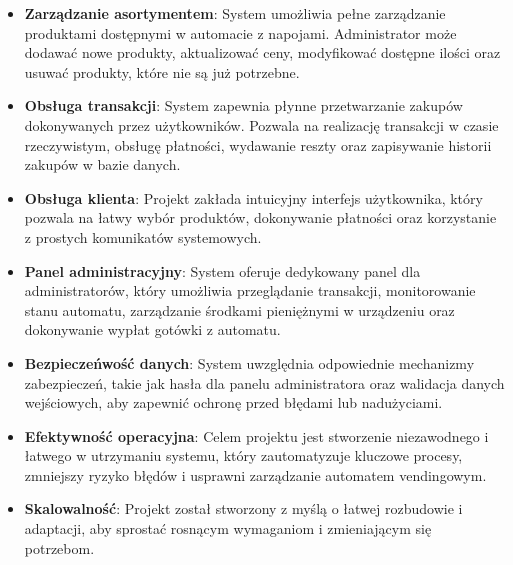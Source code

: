 \begin{itemize}
\item \textbf{Zarządzanie asortymentem}: System umożliwia pełne zarządzanie produktami dostępnymi w automacie z napojami. Administrator może dodawać nowe produkty, aktualizować ceny, modyfikować dostępne ilości oraz usuwać produkty, które nie są już potrzebne.

\item \textbf{Obsługa transakcji}: System zapewnia płynne przetwarzanie zakupów dokonywanych przez użytkowników. Pozwala na realizację transakcji w czasie rzeczywistym, obsługę płatności, wydawanie reszty oraz zapisywanie historii zakupów w bazie danych.

\item \textbf{Obsługa klienta}: Projekt zakłada intuicyjny interfejs użytkownika, który pozwala na łatwy wybór produktów, dokonywanie płatności oraz korzystanie z prostych komunikatów systemowych. 

\item \textbf{Panel administracyjny}: System oferuje dedykowany panel dla administratorów, który umożliwia przeglądanie transakcji, monitorowanie stanu automatu, zarządzanie środkami pieniężnymi w urządzeniu oraz dokonywanie wypłat gotówki z automatu.

\item \textbf{Bezpieczeńwość danych}: System uwzględnia odpowiednie mechanizmy zabezpieczeń, takie jak hasła dla panelu administratora oraz walidacja danych wejściowych, aby zapewnić ochronę przed błędami lub nadużyciami.

\item \textbf{Efektywność operacyjna}: Celem projektu jest stworzenie niezawodnego i łatwego w utrzymaniu systemu, który zautomatyzuje kluczowe procesy, zmniejszy ryzyko błędów i usprawni zarządzanie automatem vendingowym.

\item \textbf{Skalowalność}: Projekt został stworzony z myślą o łatwej rozbudowie i adaptacji, aby sprostać rosnącym wymaganiom i zmieniającym się potrzebom.

\end{itemize}







